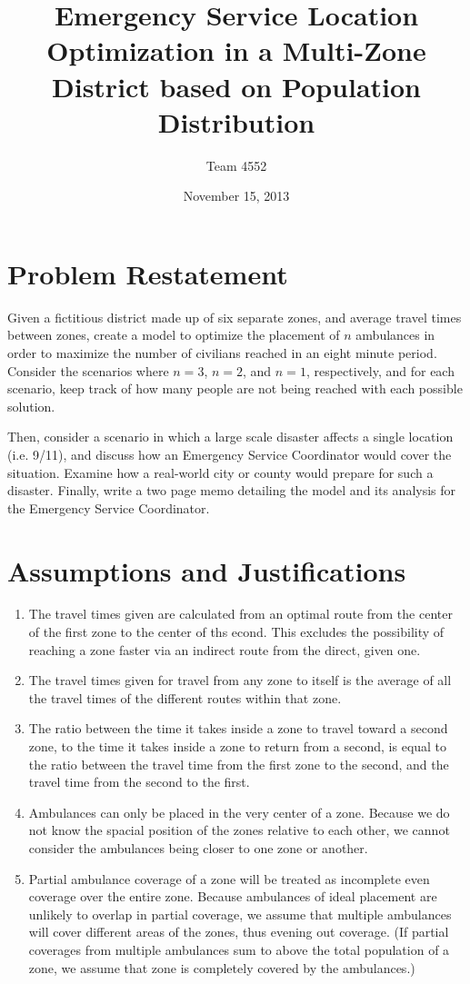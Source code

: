 \documentclass[notitlepage, 12pt]{article}
\title{\textbf{Emergency Service Location Optimization in a Multi-Zone District based on Population Distribution}}
\author{Team 4552}
\date{November 15, 2013}
\begin{document}
\maketitle

\tableofcontents
\newpage
\section{Problem Restatement}
Given a fictitious district made up of six separate zones, and average travel times between zones, create a model to optimize the placement of $n$ ambulances in order to maximize the number of civilians reached in an eight minute period. Consider the scenarios where $n = 3$, $n = 2$, and $n = 1$, respectively, and for each scenario, keep track of how many people are not being reached with each possible solution.

Then, consider a scenario in which a large scale disaster affects a single location (i.e. 9/11), and discuss how an Emergency Service Coordinator would cover the situation. Examine how a real-world city or county would prepare for such a disaster. Finally, write a two page memo detailing the model and its analysis for the Emergency Service Coordinator.


\section{Assumptions and Justifications}
\begin{enumerate}
    \item
        The travel times given are calculated from an optimal route from the center of the first
        zone to the center of ths econd. This excludes the possibility of reaching a zone faster
        via an indirect route from the direct, given one.
    \item
        The travel times given for travel from any zone to itself is the average
        of all the travel times of the different routes within that zone.
    \item
        The ratio between the time it takes inside a zone to travel toward a second zone,
        to the time it takes inside a zone to return from a second, is equal to the ratio
        between the travel time from the first zone to the second, and the travel time from the
        second to the first.
    \item
        Ambulances can only be placed in the very center of a zone. Because we do not know the
        spacial position of the zones relative to each other, we cannot consider the ambulances
        being closer to one zone or another.
    \item
        Partial ambulance coverage of a zone will be treated as incomplete even coverage over the entire
        zone. Because ambulances of ideal placement are unlikely to overlap in partial coverage, we assume
        that multiple ambulances will cover different areas of the zones, thus evening out coverage.
        (If partial coverages from multiple ambulances sum to above the total population of a zone,
        we assume that zone is completely covered by the ambulances.)
\end{enumerate}
\end{document}

